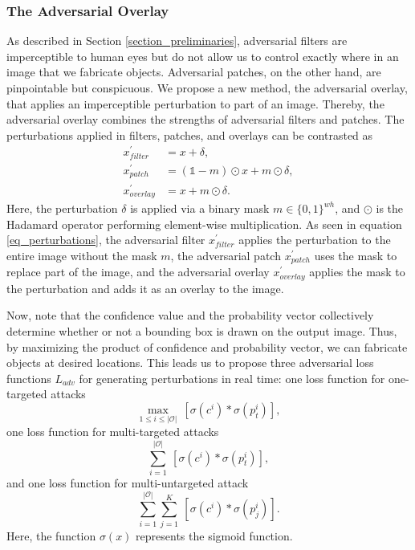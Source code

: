 
\subsubsection{The Adversarial Overlay}

As described in Section \ref{section_preliminaries}, adversarial filters are imperceptible to human eyes but do not allow us to control exactly where in an image that we fabricate objects. Adversarial patches, 
on the other hand, are pinpointable but conspicuous. We propose a new method, the adversarial overlay, that applies an imperceptible perturbation to part of an image. Thereby, the adversarial overlay combines the strengths of adversarial filters and patches. The perturbations applied in filters, patches, and overlays can be contrasted as 
\begin{subequations}
\label{eq_perturbations}
\begin{align}
    x^{'}_{filter} &= x + \delta, \\
    x^{'}_{patch} &= (\mathbb{1}-m) \odot x + m \odot \delta, \\
    x^{'}_{overlay} &= x + m \odot \delta.
\end{align}
\end{subequations}
Here, the perturbation $\delta$ is applied via a binary mask $m \in \{0, 1\}^{wh}$, and $\odot$ is the Hadamard operator performing element-wise multiplication. As seen in equation \eqref{eq_perturbations}, the adversarial filter $x^{'}_{filter}$ applies the perturbation to the entire image without the mask $m$, the adversarial patch $x^{'}_{patch}$ uses the mask to replace part of the image, and the adversarial overlay $x^{'}_{overlay}$ applies the mask to the perturbation and adds it as an overlay to the image.

Now, note that the confidence value and the probability vector collectively determine whether or not a bounding box is drawn on the output image. Thus, by maximizing the product of confidence and probability vector, we can fabricate objects at desired locations. This leads us to propose three adversarial loss functions $L_{adv}$ for generating perturbations in real time: one loss function for one-targeted attacks
\setcounter{equation}{2}
\begin{equation}
\max_{1 \leq i \leq |\mathcal{O}|}\ [\sigma(c^i) * \sigma(p^i_t)] \label{eq:one-targeted},
\end{equation}
one loss function for multi-targeted attacks 
\begin{equation}
\sum^{|\mathcal{O}|}_{i = 1}\ [\sigma(c^i) * \sigma(p^i_t)] \label{eq:multi-targeted},    
\end{equation}
and one loss function for multi-untargeted attack
\begin{equation}
\sum^{|\mathcal{O}|}_{i = 1} \sum_{j=1}^{K}\ [\sigma(c^i) *\sigma(p^i_j)] \label{eq:multi-untargeted}.    
\end{equation}
Here, the function $\sigma (x)$ represents the sigmoid function.

